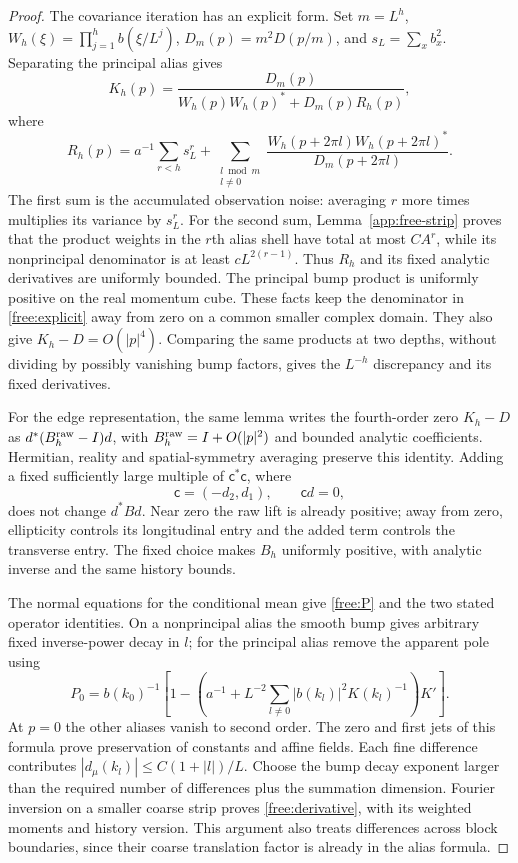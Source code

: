 \begin{proof}
The covariance iteration has an explicit form. Set $m=L^h$,
$W_h(\xi)=\prod_{j=1}^hb(\xi/L^j)$,
$D_m(p)=m^2D(p/m)$, and $s_L=\sum_xb_x^2$. Separating the principal
alias gives
\begin{equation}
\label{free:explicit}
 K_h(p)=\frac{D_m(p)}{W_h(p)W_h(p)^*+D_m(p)R_h(p)},
\end{equation}
where
\[
 R_h(p)=a^{-1}\sum_{r<h}s_L^r
 +\sum_{\substack{l\bmod m\\l\ne0}}
      \frac{W_h(p+2\pi l)W_h(p+2\pi l)^*}{D_m(p+2\pi l)}.
\]
The first sum is the accumulated observation noise: averaging $r$ more
times multiplies its variance by $s_L^r$. For the second sum,
Lemma~\ref{app:free-strip} proves that the product weights in the $r$th
alias shell have total at most $CA^r$, while its nonprincipal denominator
is at least $cL^{2(r-1)}$. Thus $R_h$ and its fixed analytic derivatives
are uniformly bounded. The principal bump product is uniformly positive
on the real momentum cube. These facts keep the denominator in
\eqref{free:explicit} away from zero on a common smaller complex domain.
They also give $K_h-D=O(|p|^4)$. Comparing the same products at two depths,
without dividing by possibly vanishing bump factors, gives the
$L^{-h}$ discrepancy and its fixed derivatives.

For the edge representation, the same lemma writes the fourth-order
zero $K_h-D$ as $d^*(B_h^{\rm raw}-I)d$, with
$B_h^{\rm raw}=I+O(|p|^2)$ and bounded analytic coefficients.
Hermitian, reality and spatial-symmetry averaging preserve this identity.
Adding a fixed sufficiently large multiple of $\mathsf c^*\mathsf c$, where
\[
 \mathsf c=(-d_2,d_1),\qquad \mathsf c d=0,
\]
does not change $d^*Bd$. Near zero the raw lift is already positive;
away from zero, ellipticity controls its longitudinal entry and the
added term controls the transverse entry. The fixed choice makes $B_h$
uniformly positive, with analytic inverse and the same history bounds.

The normal equations for the conditional mean give \eqref{free:P} and
the two stated operator identities. On a nonprincipal alias the smooth
bump gives arbitrary fixed inverse-power decay in $l$; for the principal
alias remove the apparent pole using
\[
 P_0=b(k_0)^{-1}\left[1-
 \left(a^{-1}+L^{-2}\sum_{l\ne0}|b(k_l)|^2K(k_l)^{-1}\right)K'\right].
\]
At $p=0$ the other aliases vanish to second order. The zero and first
jets of this formula prove preservation of constants and affine fields.
Each fine difference contributes $|d_\mu(k_l)|\le C(1+|l|)/L$.
Choose the bump decay exponent larger than the required number of
differences plus the summation dimension. Fourier inversion on a
smaller coarse strip proves \eqref{free:derivative}, with its weighted
moments and history version. This argument also treats differences
across block boundaries, since their coarse translation factor is
already in the alias formula.


\end{proof}
